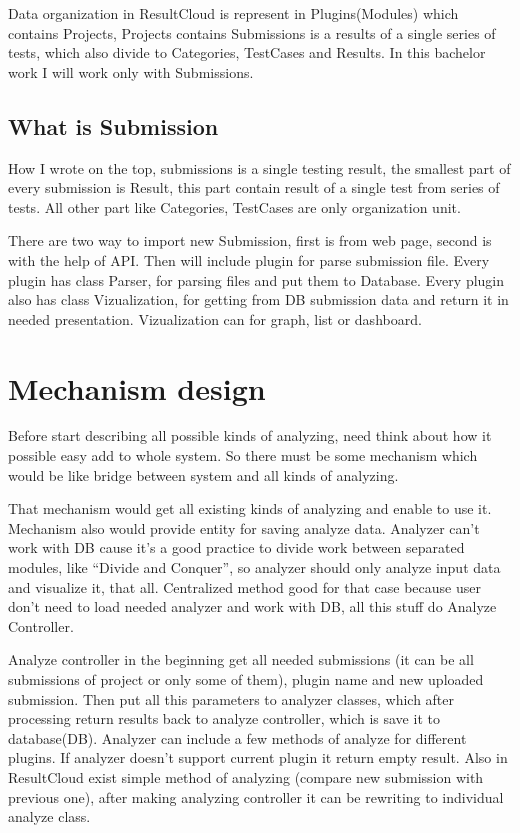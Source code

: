 \documentclass[a4paper,11pt]{article}
\begin{document}
Data organization in ResultCloud is represent in Plugins(Modules) which contains Projects, Projects  contains Submissions is a results of a single series of tests, which also divide to Categories, TestCases and Results.
In this bachelor work I will work only with Submissions.

\subsection{What is Submission}

How I wrote on the top, submissions is a single testing result, the smallest part of every submission is Result, this part contain result of a single test from series of tests. All other part like Categories, TestCases are only organization unit. 

There are two way to import  new Submission, first is from web page, second is with the help of API. Then will include plugin for parse submission file. Every plugin has class Parser, for parsing files and put them to Database. Every plugin also has class Vizualization, for getting from DB submission data and return it in needed presentation. Vizualization can for graph, list or dashboard.  

\section{Mechanism design}

Before start describing all possible kinds of analyzing, need think about how it possible easy add to whole system. So there must be some mechanism which would be like bridge between system and all kinds of analyzing.

That mechanism would get all existing kinds of analyzing and enable to use it. Mechanism also would provide entity for saving analyze data. Analyzer can't work with DB cause it's a good practice to divide work between separated modules, like “Divide and Conquer”, so analyzer should only analyze input data and visualize it, that all. Centralized method good for that case because user don't need to load needed analyzer and work with DB, all this stuff do Analyze Controller.

Analyze controller in the beginning get all needed submissions (it can be all submissions of project or only some of them), plugin name and new uploaded submission. Then put all this parameters to analyzer classes, which after processing return results back to analyze controller, which is save it to database(DB). Analyzer can include a few methods of analyze for different plugins. If analyzer doesn't support current plugin it return empty result. Also in ResultCloud exist simple method of analyzing (compare new submission with previous one), after making analyzing controller it can be rewriting to individual analyze class.
\end{document}

